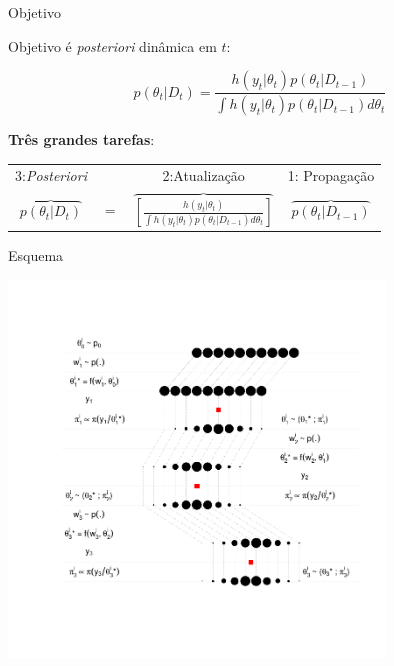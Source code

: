 \documentclass{beamer}
\begin{document}
\begin{frame}{Objetivo}

Objetivo é \textit{posteriori} dinâmica em $t$:

\vspace{0.5cm}

$$
p(\theta_t|D_t)  = \frac{h(y_t|\theta_t)  p(\theta_t|D_{t-1}) }{\int h(y_t|\theta_t)p(\theta_t|D_{t-1})d \theta_t}
$$

\pause

\textbf{Três grandes tarefas}:
\vspace{0.5cm}

\begin{tabular}{cccc}
3:\textit{Posteriori} & & 2:Atualização & 1: Propagação \\
$\overbrace{p(\theta_t|D_t)} $ & $=$ & $\overbrace{\left[\frac{h(y_t|\theta_t)}{\int h(y_t|\theta_t)p(\theta_t|D_{t-1})d \theta_t}\right]} $& $\overbrace{p(\theta_t|D_{t-1})}$
\end{tabular}

\end{frame}

\begin{frame}{Esquema}

  \begin{center}
  \includegraphics[height=10cm,keepaspectratio]{filtroparticulassequencial.pdf}
  \end{center}
  
  
\end{frame}
\end{document}
